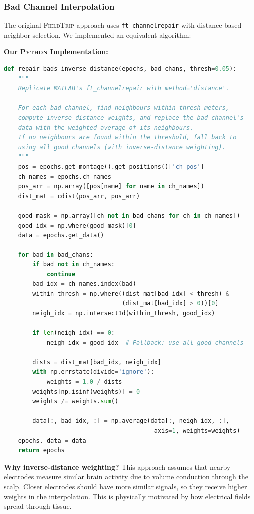 \documentclass[11pt,a4paper]{article}
\newcommand{\python}{\textsc{Python}}
\newcommand{\fieldtrip}{\textsc{FieldTrip}}
\begin{document}
\subsubsection{Bad Channel Interpolation}

The original \fieldtrip{} approach uses \texttt{ft\_channelrepair} with distance-based neighbor selection. We implemented an equivalent algorithm:

\textbf{Our \python{} Implementation:}
\begin{lstlisting}[style=pythonstyle,language=Python]
def repair_bads_inverse_distance(epochs, bad_chans, thresh=0.05):
    """
    Replicate MATLAB's ft_channelrepair with method='distance'.

    For each bad channel, find neighbours within thresh meters,
    compute inverse-distance weights, and replace the bad channel's
    data with the weighted average of its neighbours.
    If no neighbours are found within the threshold, fall back to
    using all good channels (with inverse-distance weighting).
    """
    pos = epochs.get_montage().get_positions()['ch_pos']
    ch_names = epochs.ch_names
    pos_arr = np.array([pos[name] for name in ch_names])
    dist_mat = cdist(pos_arr, pos_arr)

    good_mask = np.array([ch not in bad_chans for ch in ch_names])
    good_idx = np.where(good_mask)[0]
    data = epochs.get_data()

    for bad in bad_chans:
        if bad not in ch_names:
            continue
        bad_idx = ch_names.index(bad)
        within_thresh = np.where((dist_mat[bad_idx] < thresh) &
                                 (dist_mat[bad_idx] > 0))[0]
        neigh_idx = np.intersect1d(within_thresh, good_idx)

        if len(neigh_idx) == 0:
            neigh_idx = good_idx  # Fallback: use all good channels

        dists = dist_mat[bad_idx, neigh_idx]
        with np.errstate(divide='ignore'):
            weights = 1.0 / dists
        weights[np.isinf(weights)] = 0
        weights /= weights.sum()

        data[:, bad_idx, :] = np.average(data[:, neigh_idx, :],
                                          axis=1, weights=weights)
    epochs._data = data
    return epochs
\end{lstlisting}

\textbf{Why inverse-distance weighting?}
This approach assumes that nearby electrodes measure similar brain activity due to volume conduction through the scalp. Closer electrodes should have more similar signals, so they receive higher weights in the interpolation. This is physically motivated by how electrical fields spread through tissue.
\end{document}
